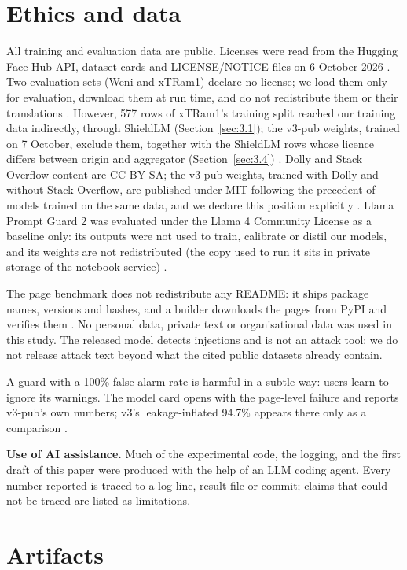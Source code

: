 \documentclass[11pt]{article}
\begin{document}
\section{Ethics and data}\label{sec:12}

All training and evaluation data are public. Licenses were read from the Hugging Face Hub API, dataset cards and LICENSE/NOTICE files on 6 October 2026%
. Two evaluation sets (Weni and xTRam1) declare no license; we load them only for evaluation, download them at run time, and do not redistribute them or their translations%
. However, 577 rows of xTRam1's training split reached our training data indirectly, through ShieldLM (Section~\ref{sec:3.1}); the v3-pub weights, trained on 7 October, exclude them, together with the ShieldLM rows whose licence differs between origin and aggregator (Section~\ref{sec:3.4})%
. Dolly and Stack Overflow content are CC-BY-SA; the v3-pub weights, trained with Dolly and without Stack Overflow, are published under MIT following the precedent of models trained on the same data, and we declare this position explicitly%
. Llama Prompt Guard 2 was evaluated under the Llama 4 Community License as a baseline only: its outputs were not used to train, calibrate or distil our models, and its weights are not redistributed (the copy used to run it sits in private storage of the notebook service)%
.

The page benchmark does not redistribute any README: it ships package names, versions and hashes, and a builder downloads the pages from PyPI and verifies them%
. No personal data, private text or organisational data was used in this study. The released model detects injections and is not an attack tool; we do not release attack text beyond what the cited public datasets already contain.

A guard with a 100\% false-alarm rate is harmful in a subtle way: users learn to ignore its warnings. The model card opens with the page-level failure and reports v3-pub's own numbers; v3's leakage-inflated 94.7\% appears there only as a comparison%
.

\textbf{Use of AI assistance.} Much of the experimental code, the logging, and the first draft of this paper were produced with the help of an LLM coding agent. Every number reported is traced to a log line, result file or commit; claims that could not be traced are listed as limitations. %

\section{Artifacts}\label{sec:13}
\end{document}
